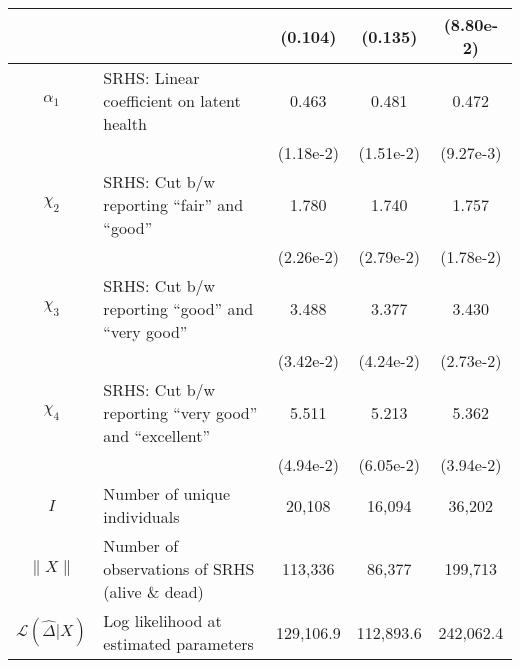 \begin{table}
\begin{center}
{\begin{tabular}{clccc}
\rule{0pt}{2.2ex} & & (0.104) & (0.135) & (8.80e-2) \\
\hline
\rule{0pt}{2.2ex}$\alpha_1$ & SRHS: Linear coefficient on latent health & 0.463 & 0.481 & 0.472 \\
\rule{0pt}{2.2ex} & & (1.18e-2) & (1.51e-2) & (9.27e-3) \\
\rule{0pt}{2.2ex}$\chi_2$ & SRHS: Cut b/w reporting ``fair'' and ``good'' & 1.780 & 1.740 & 1.757 \\
\rule{0pt}{2.2ex} & & (2.26e-2) & (2.79e-2) & (1.78e-2) \\
\rule{0pt}{2.2ex}$\chi_3$ & SRHS: Cut b/w reporting ``good'' and ``very good'' & 3.488 & 3.377 & 3.430 \\
\rule{0pt}{2.2ex} & & (3.42e-2) & (4.24e-2) & (2.73e-2) \\
\rule{0pt}{2.2ex}$\chi_4$ & SRHS: Cut b/w reporting ``very good'' and ``excellent'' & 5.511 & 5.213 & 5.362 \\
\rule{0pt}{2.2ex} & & (4.94e-2) & (6.05e-2) & (3.94e-2) \\
\hline
\rule{0pt}{2.2ex}$I$ & Number of unique individuals & 20,108 & 16,094 & 36,202\\
\rule{0pt}{2.2ex}$\lVert X \rVert$ & Number of observations of SRHS (alive \& dead) & 113,336 & 86,377 & 199,713\\
\rule{0pt}{2.2ex}$\mathcal{L}(\widehat{\Delta} | X)$ & Log likelihood at estimated parameters & 129,106.9 & 112,893.6 & 242,062.4\\
\hline\hline
\end{tabular}
 } 
\usebox{\HRSonlyTableBox}  
\end{center}
\end{table}
